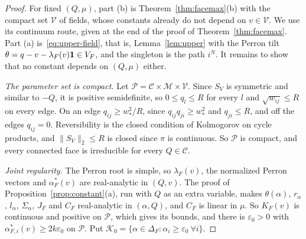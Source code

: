 \begin{proof}
For fixed $(Q,\mu)$, part (b) is Theorem~\ref{thm:facemax}(b) with the compact
set $\mathcal V$ of fields, whose constants already do not depend on
$v\in\mathcal V$. We use its continuum route, given at the end of the proof of
Theorem~\ref{thm:facemax}. Part (a) is~\eqref{eq:upper-field}, that is, Lemma~\ref{lem:upper}
with the Perron tilt $\theta=q-v-\lambda_F(v)\mathbf{1}\in V_F$, and the singleton is
the path $i^N$. It remains to show that no constant depends on $(Q,\mu)$ either.

\emph{The parameter set is compact.} Let $\mathcal P=\mathcal C\times\mathcal M\times\mathcal V$.
Since $S_V$ is symmetric and similar to $-Q$, it is positive semidefinite, so
$0\le q_l\le R$ for every $l$ and $\sqrt{w_{ij}}\le R$ on every edge.
On an edge $q_{ij}\ge w_*^2/R$, since $q_{ij}q_{ji}\ge w_*^2$ and $q_{ji}\le R$, and off the
edges $q_{ij}=0$. Reversibility is the closed condition of Kolmogorov on cycle products,
and $\|S_V\|_2\le R$ is closed since $\pi$ is continuous. So $\mathcal P$ is compact, and
every connected face is irreducible for every $Q\in\mathcal C$.

\emph{Joint regularity.} The Perron root is simple, so $\lambda_F(v)$, the normalized
Perron vectors and $\alpha^*_F(v)$ are real-analytic in $(Q,v)$. The proof of
Proposition~\ref{prop:constant}(a), run with $Q$ as an extra variable, makes
$\theta(\alpha)$, $r_\alpha$, $l_\alpha$, $\Sigma_\alpha$, $J_F$ and $C_F$ real-analytic in
$(\alpha,Q)$, and $C_F$ is linear in $\mu$. So $K_F(v)$ is continuous and positive on
$\mathcal P$, which gives its bounds, and there is $\varepsilon_0>0$ with
$\alpha^*_{F,i}(v)\ge2k\varepsilon_0$ on $\mathcal P$. Put
$\mathcal K_0=\{\alpha\in\Delta_F:\alpha_i\ge\varepsilon_0\ \forall i\}$.


\end{proof}
